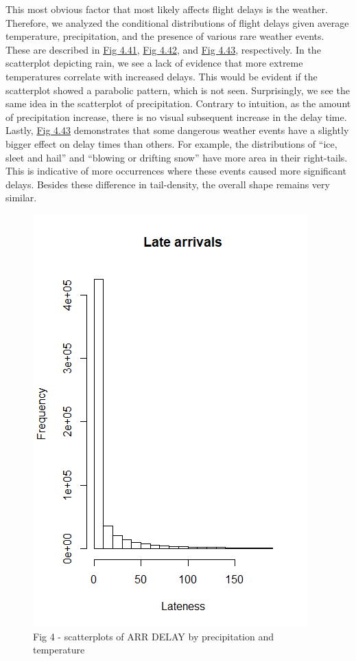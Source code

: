 \documentclass[12pt, a4paper]{book}
\newcommand\tab[1][1cm]{\hspace*{#1}}
\begin{document}
			\tab This most obvious factor that most likely affects flight delays is the weather. Therefore, we analyzed the conditional distributions of flight delays given average temperature, precipitation, and the presence of various rare weather events. These are described in \underline{Fig 4.41}, \underline{Fig 4.42}, and \underline{Fig 4.43}, respectively. In the scatterplot depicting rain, we see a lack of evidence that more extreme temperatures correlate with increased delays. This would be evident if the scatterplot showed a parabolic pattern, which is not seen. Surprisingly, we see the same idea in the scatterplot of precipitation. Contrary to intuition, as the amount of precipitation increase, there is no visual subsequent increase in the delay time. Lastly, \underline{Fig 4.43} demonstrates that some dangerous weather events have a slightly bigger effect on delay times than others. For example, the distributions of “ice, sleet and hail” and “blowing or drifting snow” have more area in their right-tails. This is indicative of more occurrences where these events caused more significant delays. Besides these difference in tail-density, the overall shape remains very similar. \\
			\begin{figure}[h]
	 		\includegraphics[width = .75 \textwidth]{../figures/LateArrivalsHistogram}
	 		\caption{Fig 4 - scatterplots of ARR DELAY by precipitation and temperature}
	 		\end{figure}
\end{document}
